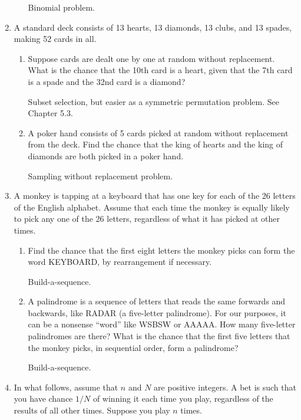 \documentclass[11pt]{article}
\begin{document}
\begin{enumerate}
\begin{enumerate}
                {\color{red} Binomial problem.}
        \end{enumerate}

    \item A standard deck consists of 13 hearts, 13 diamonds, 13 clubs, and 13 spades, making 52 cards in all. 

        \begin{enumerate}
            \item Suppose cards are dealt one by one at random without replacement.
    What is the chance that the 10th card is a heart, given that the 7th card is a spade and the 32nd card is a diamond?

    {\color{red} Subset selection, but easier as a symmetric permutation problem. See Chapter 5.3.}
            \item A poker hand consists of 5 cards picked at random without replacement from the deck. 
    Find the chance that the king of hearts and the king
    of diamonds are both picked in a poker hand.

    {\color{red} Sampling without replacement problem.}
        \end{enumerate}

    \item A monkey is tapping at a keyboard that has one key for each of the 26 letters of the English alphabet. Assume that
each time the monkey is equally likely to pick any one of the 26 letters, regardless of what it has picked at other times.
        \begin{enumerate}
            \item Find the chance that the first eight letters the monkey picks can form the word KEYBOARD, by rearrangement 
        if necessary.

        {\color{red} Build-a-sequence.}
            \item A palindrome is a sequence of letters that reads the same forwards and backwards, like RADAR (a five-letter palindrome). 
        For our purposes, it can be a nonsense ``word'' like WSBSW or AAAAA.
        How many five-letter palindromes are there? What is the chance that the first five letters that the monkey picks, in sequential order, form
        a palindrome?

        {\color{red} Build-a-sequence.}
        \end{enumerate}

    \item In what follows, assume that $n$ and $N$ are positive integers. A bet is such that you have chance $1/N$ of winning it each time you play, regardless of the results of all other times. 
Suppose you play $n$ times. 


\end{enumerate}
\end{document}
